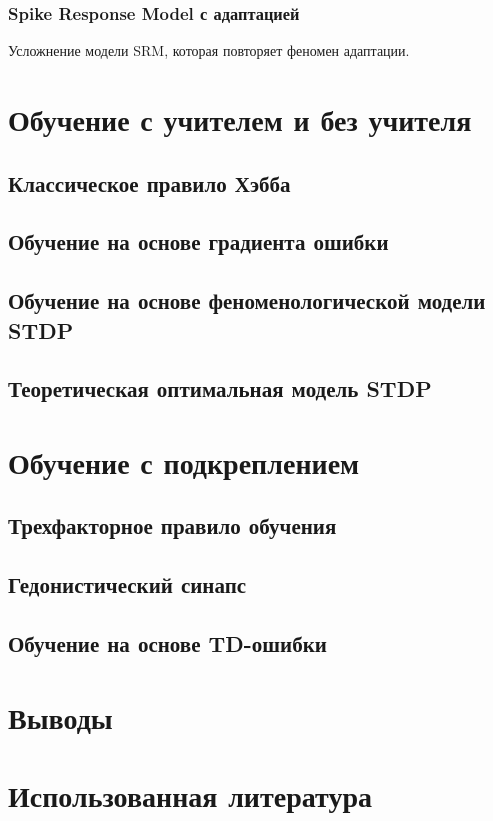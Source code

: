 \documentclass[a4paper,10pt]{article}
\begin{document}
\subsubsection{Spike Response Model с адаптацией}
Усложнение модели SRM, которая повторяет феномен адаптации.

\section{Обучение с учителем и без учителя}
\subsection{Классическое правило Хэбба}
\subsection{Обучение на основе градиента ошибки}
\subsection{Обучение на основе феноменологической модели STDP}
\subsection{Теоретическая оптимальная модель STDP}
\section{Обучение с подкреплением}
\subsection{Трехфакторное правило обучения}
\subsection{Гедонистический синапс}
\subsection{Обучение на основе TD-ошибки}
\section{Выводы}
\section{Использованная литература}
{}

\end{document}
